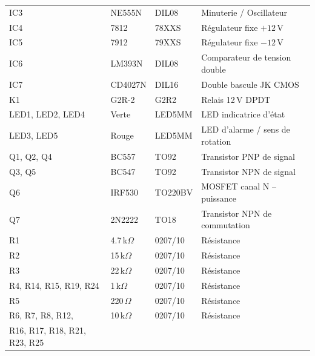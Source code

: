\documentclass[a4paper,12pt,openany]{book}
\begin{document}
\begin{longtable}{|p{3.8cm}|p{3cm}|p{3.5cm}|p{5.5cm}|}
  IC3                           & NE555N          & DIL08         & Minuterie / Oscillateur \\
  IC4                           & 7812            & 78XXS         & R\'egulateur fixe $+12$\,V \\
  IC5                           & 7912            & 79XXS         & R\'egulateur fixe $-12$\,V \\
  IC6                           & LM393N          & DIL08         & Comparateur de tension double \\
  IC7                           & CD4027N         & DIL16         & Double bascule JK CMOS \\
  \hline
  K1                            & G2R-2           & G2R2          & Relais 12\,V DPDT \\
  \hline
  LED1, LED2, LED4              & Verte           & LED5MM        & LED indicatrice d'\'etat \\
  LED3, LED5                   & Rouge           & LED5MM        & LED d'alarme / sens de rotation \\
  \hline
  Q1, Q2, Q4                   & BC557           & TO92          & Transistor PNP de signal \\
  Q3, Q5                       & BC547           & TO92          & Transistor NPN de signal \\
  Q6                            & IRF530          & TO220BV       & MOSFET canal N -- puissance \\
  Q7                            & 2N2222          & TO18          & Transistor NPN de commutation \\
  \hline
  R1                            & 4.7\,k$\Omega$  & 0207/10       & R\'esistance \\
  R2                            & 15\,k$\Omega$   & 0207/10       & R\'esistance \\
  R3                            & 22\,k$\Omega$   & 0207/10       & R\'esistance \\
  R4, R14, R15, R19, R24       & 1\,k$\Omega$    & 0207/10       & R\'esistance \\
  R5                            & 220\,$\Omega$   & 0207/10       & R\'esistance \\
  R6, R7, R8, R12,             & 10\,k$\Omega$   & 0207/10       & R\'esistance \\
  R16, R17, R18, R21, R23, R25 &                 &               & \\

\end{longtable}
\end{document}
